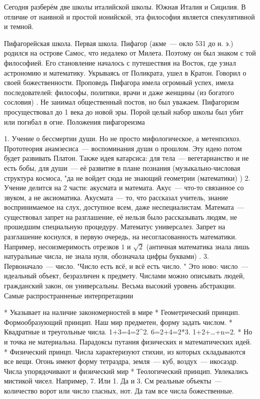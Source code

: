 Сегодня разберём две школы италийской школы. Южная Италия и Сицилия. 
В отличие от наивной и простой ионийской, эта философия является спекулятивной и темной. 

Пифагорейская школа. 
Первая школа. 
Пифагор (акме~--- окло 531 до н. э.) родился на острове Самос, что недалеко от Милета. Поэтому он был знаком с той философией. 
Его становление началось с путешествия на Восток, где узнал астрономию и математику. Укрываясь от Поликрата, ушел в Кратон. Говорил о своей божественности. 
Проповедь Пифагора имела огромный успех, имела последователей: философы, политики, врачи и даже женщины (из богатого сословия) . Не занимал общественный постов, но был уважаем. 
Пифагоризм просуществовал до 1 века до новой эры. Порой целый набор школы был убит или погибал в огне. 
Положения пифагореизма

	1. Учение о бессмертии души. Но не просто мифологическое, а метенпсихоз. Прототеория анамзесиса~--- воспоминания души о прошлом. Эту идею потом будет развивать Платон. 
	Также идея катарсиса: для тела~--- вегетарианство и не есть бобы, для души~--- её развитие в плане познания (музыкально-числовая структура космоса, "да не войдет сюда не знающий геометрии (математики) ) 
	2. Учение делится на 2 части: акусмата и математа. Акус~--- что-то связанное со звуком, а не аксиоматика. Акусмата~--- то, что рассказал учитель, знание воспринимаемое на слух, доступное всем, даже неспециалистам. Математа~--- существовал запрет на разглашение, её нельзя было рассказывать людям, не прошедшим специальную процедуру. 
	Математус универсалез. Запрет на разглашение коснулся, в первую очередь, на несогласованность математики. 
	Например, несоизмеримость отрезков $1$ и $\sqrt{2}$ (античная математика знала лишь натуральные числа, не знала нуля, обозначала цифры буквами) . 
	3. Первоначало~--- число. "Число есть всё, и всё есть число. " Это ново: число~--- идеальный объект, безразличен к предмету. 
	Числами можно описывать людей, гражданский закон, он универсальны. Весьма высокий уровень абстракции. Самые распространненые интерпретациии


	* Указывает на наличие закономерностей в мире
	* Геометрический принцип. Формообразующий принцип. Наш мир предметен, форму задать числом. 
	* Квадратные и треугольные числа. 1+3=4=2^2. 6=2+4=2*3. 1+2+\ldots+n=2. 
	* Но и точка не материальна. Парадоксы путания физических и математических идей. 
	* Физический принцп. Числа характеризуют стихии, из которых складываются все вещи. Огонь имеют форму тетраэдра, земля~--- куб, воздух~--- икосаэдр. Числа упорядочивают и физический мир
	* Теологический принцип. Увлекались мистикой чисел. Например, 7. Или 1. Да и 3. См реальные объекты~--- количество ворот или число гласных, нот. Да там все числа божественные. 

